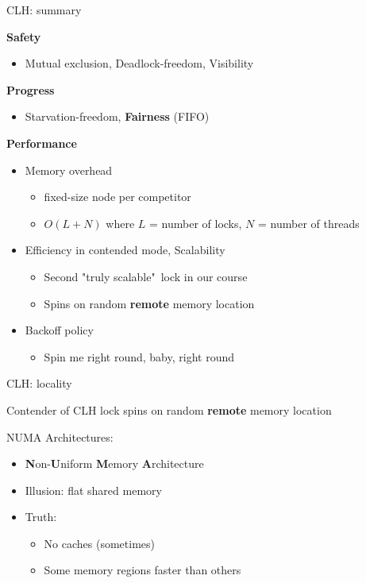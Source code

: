 \begin{frame}{CLH: summary}

\textbf{Safety}
\begin{itemize}
  \item Mutual exclusion, Deadlock-freedom, Visibility
\end{itemize}

\textbf{Progress}
\begin{itemize}
  \item Starvation-freedom, \textbf{Fairness} (FIFO)
\end{itemize}

\textbf{Performance}
\begin{itemize}
  \item Memory overhead
  \begin{itemize}
    \item fixed-size node per competitor
    \item $O(L+N)$ where $L$ = number of locks, $N$ = number of threads
  \end{itemize}
  \item Efficiency in contended mode, Scalability
  \begin{itemize}
    \item Second "truly scalable"\ lock in our course
    \item Spins on random \textbf{remote} memory location
  \end{itemize}  
  \item Backoff policy  
  \begin{itemize}
    \item Spin me right round, baby, right round
  \end{itemize}  
\end{itemize}
\end{frame}


\begin{frame}[t]{CLH: locality}

Contender of CLH lock spins on random \textbf{remote} memory location

\pause


NUMA Architectures:
\begin{itemize}
  \item \textbf{N}on-\textbf{U}niform \textbf{M}emory \textbf{A}rchitecture
  \item Illusion: flat shared memory
  \item Truth: 
  \begin{itemize}
    \item No caches (sometimes)
    \item Some memory regions faster than others
  \end{itemize}
\end{itemize}

\end{frame}

